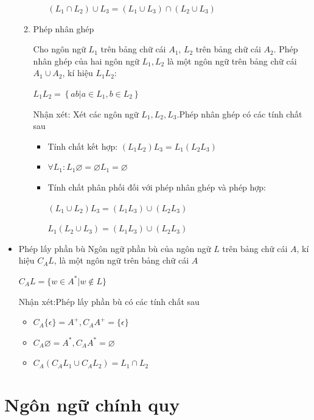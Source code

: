 \documentclass[14pt]{extreport}
\begin{document}
\begin{itemize}
\begin{enumerate}
\begin{itemize}
\begin{center}
$\left(L_1\cap L_2\right)\cup L_3=\left(L_1\cup L_3 \right)\cap \left(L_2 \cup L_3\right)$
\end{center}
\end{itemize}
\item Phép nhân ghép

Cho ngôn ngữ $L_1$ trên bảng chữ cái $A_1$, $L_2$ trên bảng chữ cái $A_2$. Phép nhân ghép của hai ngôn ngữ $L_1,L_2$ là một ngôn ngữ trên bảng chữ cái $A_1 \cup A_2$, kí hiệu $L_1L_2$:
\begin{center}
$L_1L_2=\left\{ab|a\in L_1,b\in L_2\right\}$
\end{center}

Nhận xét: Xét các ngôn ngữ $L_1,L_2,L_3$.Phép nhân ghép có các tính chất sau
\begin{itemize}
\item Tính chất kết hợp: $\left(L_1 L_2 \right) L_3=L_1 \left(L_2 L_3 \right)$
\item $\forall L_1:L_1 \varnothing =\varnothing L_1=\varnothing$
\item Tính chất phân phối đối với phép nhân ghép và phép hợp:
\begin{center}
$\left(L_1\cup L_2\right) L_3=\left(L_1 L_3 \right)\cup \left(L_2  L_3\right)$

$L_1\left( L_2\cup L_3\right)=\left(L_1 L_3 \right)\cup \left(L_2 L_3\right)$

\end{center}
\end{itemize}
\end{enumerate}

\item Phép lấy phần bù
Ngôn ngữ phần bù của ngôn ngữ $L$ trên bảng chữ cái $A$, kí hiệu $C_AL$, là một ngôn ngữ trên bảng chữ cái $A$
\begin{center}
$C_AL=\{w\in A^*|w\notin L\}$
\end{center}

Nhận xét:Phép lấy phần bù có các tính chất sau
\begin{itemize}
\item $C_A\{\epsilon \}=A^+,C_AA^+=\{\epsilon \}$
\item $C_A \varnothing =A^*,C_AA^*=\varnothing$
\item $C_A\left(C_AL_1 \cup C_AL_2 \right)=L_1 \cap L_2$
\end{itemize}
\end{itemize}

\section{Ngôn ngữ chính quy}
\end{document}
